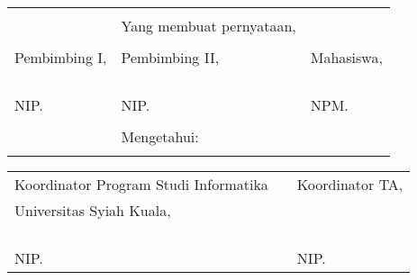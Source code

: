 \begin{singlespace}
\vspace{0.4cm}
{\renewcommand{\arraystretch}{0.8}
\centering
\begin{tabularx}{\textwidth}{llX} %
	&\tanggalSuratPernyataan		& \\
	&Yang membuat pernyataan,			& \\
	&&\\
	Pembimbing I,							&Pembimbing II,							&Mahasiswa,\\
	&&\\
	&&\\
	&&\\
	\underline{\pembimbingSatu}	&\underline{\pembimbingDua} &\underline{\penulis}\\
	NIP. \nipPembimbingSatu				&NIP. \nipPembimbingDua				&NPM. \npm \\
	&&\\
	&Mengetahui:\\			&
\end{tabularx}
}
{\renewcommand{\arraystretch}{0.8}
\begin{tabularx}{\textwidth}{llX} %
	Koordinator Program Studi Informatika	&\qquad\qquad  &Koordinator TA,\\
	Universitas Syiah Kuala,&\quad\quad  &\\
	&&\\
	&&\\
	&&\\
	\underline{\kaprodi}	&\quad\quad  &\underline{\koordinatorTA}\\
	NIP. \kaprodinip						&\quad\quad  &NIP. \koordinatorTAnip				
\end{tabularx}
}
\end{singlespace}